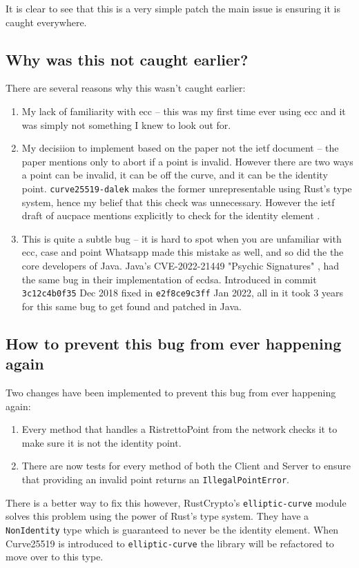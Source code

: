 It is clear to see that this is a very simple patch the main issue is ensuring it is caught everywhere.

\subsection{Why was this not caught earlier?}
There are several reasons why this wasn't caught earlier:
\begin{enumerate}
  \item{My lack of familiarity with \gls{ecc} -- this was my first time ever using \gls{ecc} and it was simply not something I knew to look out for.}
  \item{My decisiion to implement based on the paper not the \gls{ietf} document -- the paper mentions only to abort if a point is invalid. However there are two ways a point can be invalid, it can be off the curve, and it can be the identity point. \texttt{curve25519-dalek} makes the former unrepresentable using Rust's type system, hence my belief that this check was unnecessary. However the \gls{ietf} draft of \gls{aucpace} mentions explicitly to check for the identity element \cite{ietf-aucpace}.}
  \item{This is quite a subtle bug -- it is hard to spot when you are unfamiliar with \gls{ecc}, case and point Whatsapp made this mistake as well, and so did the the core developers of Java. Java's CVE-2022-21449 "Psychic Signatures" \cite{java-psychic-signatures}, had the same bug in their implementation of \gls{ecdsa}. Introduced in commit \texttt{3c12c4b0f35} Dec 2018 fixed in \texttt{e2f8ce9c3ff} Jan 2022, all in it took 3 years for this same bug to get found and patched in Java.}
\end{enumerate}

\subsection{How to prevent this bug from ever happening again}
Two changes have been implemented to prevent this bug from ever happening again:
\begin{enumerate}
  \item{Every method that handles a RistrettoPoint from the network checks it to make sure it is not the identity point.}
  \item{There are now tests for every method of both the Client and Server to ensure that providing an invalid point returns an \texttt{IllegalPointError}.}
\end{enumerate}

There is a better way to fix this however, RustCrypto's \texttt{elliptic-curve} module solves this problem using the power of Rust's type system.
They have a \texttt{NonIdentity} type which is guaranteed to never be the identity element.
When Curve25519 is introduced to \texttt{elliptic-curve} the library will be refactored to move over to this type.

